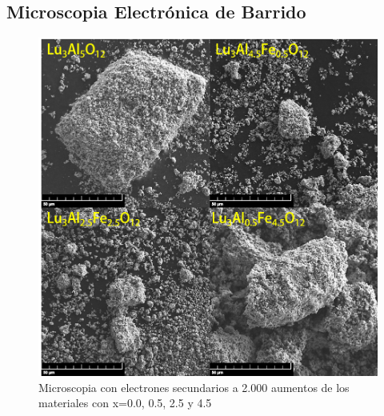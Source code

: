 \begin{appendix}
	\chapter{Microscopia Electrónica de Barrido}\label{AnexoC}

	\begin{figure}[h]
		\centering%

		\includegraphics[width=12cm]{Kap5/sec2k.png}%
		\caption{Microscopia con electrones secundarios a 2.000 aumentos de los
		materiales  con x=0.0, 0.5, 2.5 y
		4.5}\label{fig:sec2}
	\end{figure}

	\begin{figure}[h]
		\centering%


\end{figure}
\end{appendix}
